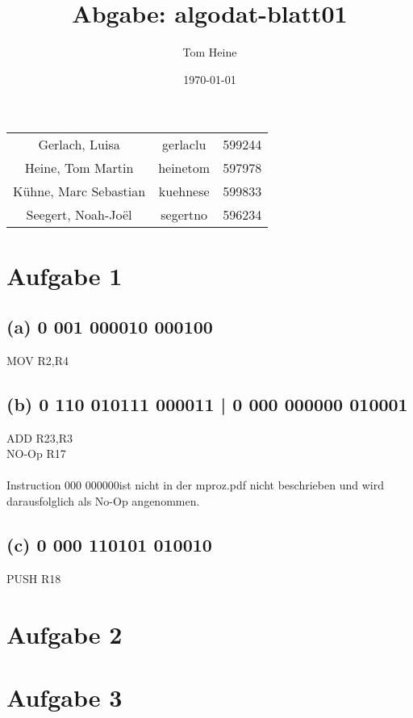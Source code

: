 \documentclass[12pt,a4paper]{scrartcl}
\author{Tom Heine}
\title{Abgabe: algodat-blatt01}
\date{\today}
\begin{document}
	\newpage
	\begin{center}
		\begin{tabular}{ccc}
			Gerlach, Luisa&gerlaclu&599244\\
			Heine, Tom Martin&heinetom&597978\\
			Kühne, Marc Sebastian&kuehnese&599833\\
			Seegert, Noah-Joël&segertno&596234
		\end{tabular}
	\end{center}
	\section*{Aufgabe 1}
	\subsection*{(a) 0 001 000010 000100}
		MOV R2,R4
	\subsection*{(b) 0 110 010111 000011 |
					 0 000 000000 010001}
		ADD R23,R3\\
		NO-Op R17\\\\Instruction {} 000 000000\grqq ist nicht in der mproz.pdf nicht beschrieben und wird darausfolglich als No-Op angenommen.
	\subsection*{(c) 0 000 110101 010010}
		PUSH R18
	\newpage
	\section*{Aufgabe 2}
	\newpage
	\section*{Aufgabe 3}
\end{document}
